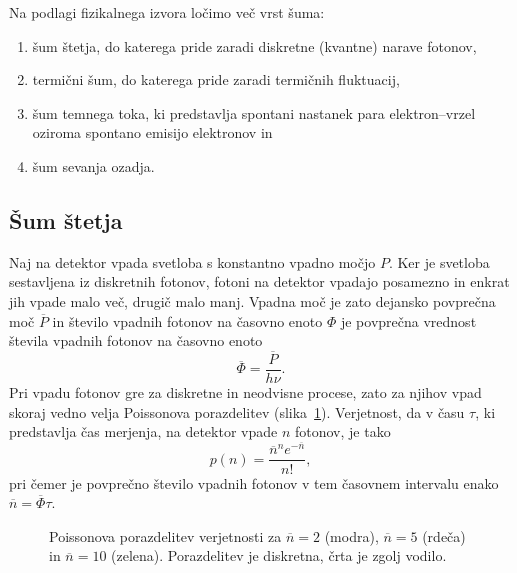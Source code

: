 Na podlagi fizikalnega izvora ločimo več vrst šuma:
\begin{enumerate}
\item šum štetja, do katerega pride zaradi diskretne (kvantne) narave fotonov,
\item termični šum, do katerega pride zaradi termičnih fluktuacij,
\item šum temnega toka, ki predstavlja spontani nastanek para elektron--vrzel oziroma spontano
emisijo elektronov in
\item šum sevanja ozadja.
\end{enumerate}

\subsection*{Šum štetja} 
Naj na detektor vpada svetloba s konstantno vpadno 
močjo $P$. Ker je svetloba sestavljena iz diskretnih fotonov, fotoni na detektor vpadajo posamezno 
in enkrat jih vpade malo več, 
drugič malo manj. Vpadna moč je zato dejansko povprečna moč $\overline{P}$ in število 
vpadnih fotonov na časovno enoto $\Phi$ je povprečna vrednost števila vpadnih fotonov na časovno enoto
\begin{equation}
\overline{\Phi} = \frac{\overline{P}}{h\nu}.
\end{equation}
Pri vpadu fotonov gre za diskretne in neodvisne procese, zato za njihov vpad skoraj vedno velja
Poissonova porazdelitev (slika~\ref{11_Poiss}). Verjetnost, da v času $\tau$, ki predstavlja 
čas merjenja, na detektor vpade $n$ fotonov, je tako 
\begin{equation}
p(n) = \frac{\overline{n}^n e^{-\overline{n}}}{n!},
\label{Poisson}
\end{equation}
pri čemer je povprečno število vpadnih fotonov v tem časovnem intervalu 
enako $\overline{n} = \overline{\Phi}\tau$.
\begin{figure}[h]
\centering
\def\svgwidth{90truemm} 

\caption{Poissonova porazdelitev verjetnosti za $\overline{n}=2$ (modra), 
$\overline{n}=5$ (rdeča) in $\overline{n}=10$ (zelena). Porazdelitev je 
diskretna, črta je zgolj vodilo.}
\label{11_Poiss}
\end{figure}


